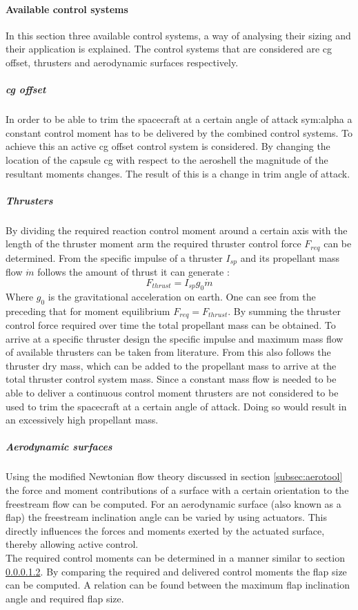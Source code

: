 \paragraph{Available control systems}
\label{control:system}
In this section three available control systems, a way of analysing their sizing and their application is explained. The control systems that are considered are \gls{cg} offset, thrusters and aerodynamic surfaces respectively.

\subparagraph{\acrfull{cg} offset}
In order to be able to trim the spacecraft at a certain angle of attack \gls{sym:alpha} a constant control moment has to be delivered by the combined control systems. To achieve this an active \gls{cg} offset control system is considered. By changing the location of the capsule \gls{cg} with respect to the aeroshell the magnitude of the resultant moments changes. The result of this is a change in trim angle of attack.


\subparagraph{Thrusters}
\label{subpar:thrusters}
By dividing the required reaction control moment around a certain axis with the length of the thruster moment arm the required thruster control force $F_{req}$ can be determined. From the specific impulse of a thruster $I_{sp}$ and its propellant mass flow $\dot{m}$ follows the amount of thrust it can generate \cite{Allen2012}:
\begin{equation}
F_{thrust}=I_{sp}g_{0}\dot{m}
\label{eq:Fthrust}
\end{equation}
Where $g_{0}$ is the gravitational acceleration on earth. One can see from the preceding that for moment equilibrium $F_{req}=F_{thrust}$. By summing the thruster control force required over time the total propellant mass can be obtained. To arrive at a specific thruster design the specific impulse and maximum mass flow of available thrusters can be taken from literature. From this also follows the thruster dry mass, which can be added to the propellant mass to arrive at the total thruster control system mass.
Since a constant mass flow is needed to be able to deliver a continuous control moment thrusters are not considered to be used to trim the spacecraft at a certain angle of attack. Doing so would result in an excessively high propellant mass.
\subparagraph{Aerodynamic surfaces}
Using the modified Newtonian flow theory discussed in section \ref{subsec:aerotool} the force and moment contributions of a surface with a certain orientation to the freestream flow can be computed. For an aerodynamic surface (also known as a flap) the freestream inclination angle can be varied by using actuators. This directly influences the forces and moments exerted by the actuated surface, thereby allowing active control.\\
The required control moments can be determined in a manner similar to section \ref{subpar:thrusters}. By comparing the required and delivered control moments the flap size can be computed. A relation can be found between the maximum flap inclination angle and required flap size. 